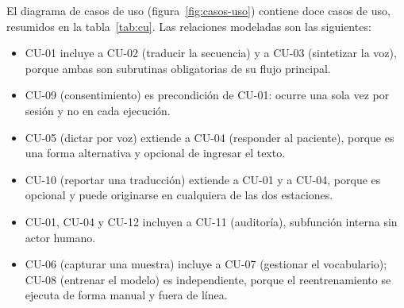 El diagrama de casos de uso (figura~\ref{fig:casos-uso}) contiene doce casos de uso, resumidos en la tabla~\ref{tab:cu}. Las relaciones modeladas son las siguientes:
\begin{itemize}
  \item CU-01 incluye a CU-02 (traducir la secuencia) y a CU-03 (sintetizar la voz), porque ambas son subrutinas obligatorias de su flujo principal.
  \item CU-09 (consentimiento) es precondición de CU-01: ocurre una sola vez por sesión y no en cada ejecución.
  \item CU-05 (dictar por voz) extiende a CU-04 (responder al paciente), porque es una forma alternativa y opcional de ingresar el texto.
  \item CU-10 (reportar una traducción) extiende a CU-01 y a CU-04, porque es opcional y puede originarse en cualquiera de las dos estaciones.
  \item CU-01, CU-04 y CU-12 incluyen a CU-11 (auditoría), subfunción interna sin actor humano.
  \item CU-06 (capturar una muestra) incluye a CU-07 (gestionar el vocabulario); CU-08 (entrenar el modelo) es independiente, porque el reentrenamiento se ejecuta de forma manual y fuera de línea.
\end{itemize}


